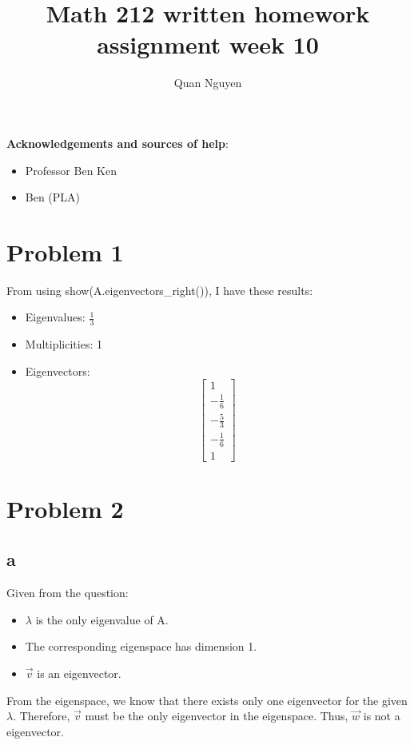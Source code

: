 \documentclass[10pt]{article}
\begin{document}
\title{Math 212 written homework assignment week 10}
\author{Quan Nguyen}
\maketitle

\bigskip
\noindent
{\bf Acknowledgements and sources of help}:
\begin{itemize}
    \item Professor Ben Ken
    \item Ben (PLA)
\end{itemize}

\bigskip
\noindent

\section*{Problem 1}
\noindent From using show(A.eigenvectors\_right()), I have these results:
\begin{itemize}
    \item Eigenvalues: $\frac{1}{3}$
    \item Multiplicities: 1
    \item Eigenvectors:
    \begin{equation*}
        \begin{bmatrix}
            1 \\ -\frac{1}{6} \\ -\frac{5}{3} \\ -\frac{1}{6} \\ 1
        \end{bmatrix}
    \end{equation*}
\end{itemize}


\section*{Problem 2}

\subsection*{a}
\noindent Given from the question:
\begin{itemize}
    \item  $\lambda$ is the only eigenvalue of A.
    \item The corresponding eigenspace has dimension 1.
    \item $\Vec{v}$ is an eigenvector.
\end{itemize}
\noindent From the eigenspace, we know that there exists only one eigenvector for the given $\lambda$. Therefore, $\Vec{v}$ must be the only eigenvector in the eigenspace. Thus, $\Vec{w}$ is not a eigenvector.
\end{document}
